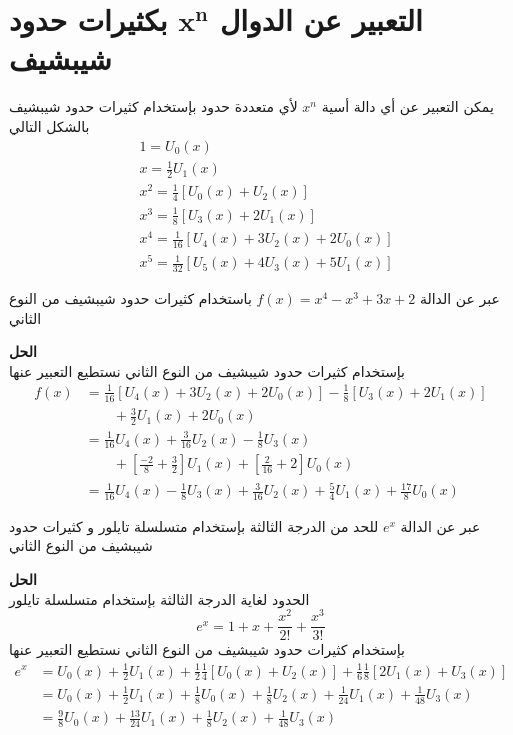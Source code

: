 \section{التعبير عن الدوال $\mathbf{x}^{\mathbf{n}}$ بكثيرات حدود شيبشيف}
يمكن التعبير عن أي دالة أسية $x^n$ لأي متعددة حدود بإستخدام كثيرات حدود شيبشيف بالشكل التالي
\begin{align*}
	&1 = U_0(x)\\
	&x = \frac{1}{2}U_1(x)\\
	&x^2 = \frac{1}{4} [U_0(x) + U_2(x)]\\
	&x^3 = \frac{1}{8} [U_3(x) + 2U_1(x)]\\
	&x^4 = \frac{1}{16}[U_4(x) + 3U_2(x) + 2U_0(x)]\\
	&x^5 = \frac{1}{32} [U_5(x) + 4U_3(x) + 5U_1(x) ]
\end{align*}

\begin{example}
	عبر عن الدالة $f(x) = x^4 - x^3 + 3x+2$ باستخدام كثيرات حدود شيبشيف من النوع الثاني
\end{example}
\noindent
\textbf{الحل}\\
\noindent
بإستخدام كثيرات حدود شيبشيف من النوع الثاني نستطيع التعبير عنها
\begin{align*}
	f(x) &= \frac{1}{16}[U_4(x) + 3U_2(x) + 2U_0(x)] - \frac{1}{8} [U_3(x) + 2U_1(x)] \\
	&\qquad + \frac{3}{2}U_1(x) + 2U_0(x) \\[5pt]
	&= \frac{1}{16}U_4(x) + \frac{3}{16}U_2(x) - \frac{1}{8}U_3(x)\\
	&\qquad + \left[\frac{-2}{8}+\frac{3}{2}\right]U_1(x) + \left[\frac{2}{16}+2\right]U_0(x)\\[5pt]
	&= \frac{1}{16}U_4(x) - \frac{1}{8}U_3(x) + \frac{3}{16}U_2(x) + \frac{5}{4}U_1(x) + \frac{17}{8}U_0(x)
\end{align*}

\begin{example}
	عبر عن الدالة $e^x$ للحد من الدرجة الثالثة بإستخدام متسلسلة تايلور و كثيرات حدود شيبشيف من النوع الثاني
\end{example}
\noindent
\textbf{الحل}\\
\noindent
الحدود لغاية الدرجة الثالثة بإستخدام متسلسلة تايلور 
\[
e^x = 1 + x + \frac{x^2}{2!} + \frac{x^3}{3!}
\]
بإستخدام كثيرات حدود شيبشيف من النوع الثاني نستطيع التعبير عنها
\begin{align*}
	e^x &= U_0(x) + \frac{1}{2}U_1(x) + \frac{1}{2}\frac{1}{4}[U_0(x) + U_2(x)] + \frac{1}{6}\frac{1}{8}[2U_1(x) + U_3(x)]\\
	&= U_0(x) + \frac{1}{2}U_1(x) + \frac{1}{8}U_0(x) + \frac{1}{8}U_2(x) + \frac{1}{24}U_1(x) + \frac{1}{48}U_3(x)\\
	&= \frac{9}{8}U_0(x) + \frac{13}{24}U_1(x) + \frac{1}{8}U_2(x) + \frac{1}{48}U_3(x)
\end{align*}

